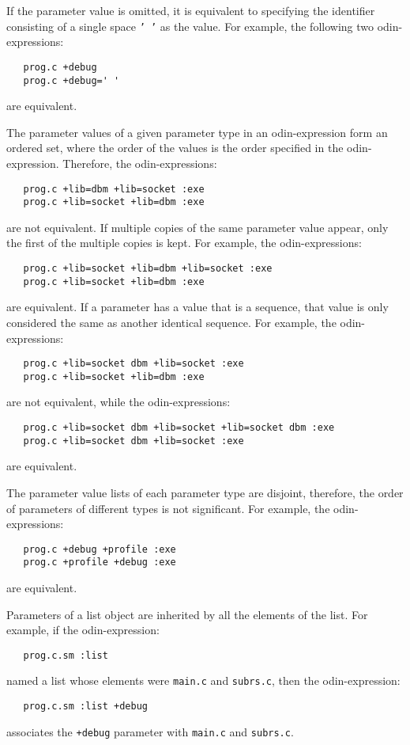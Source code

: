 \documentclass[hidelinks]{report}
\newcommand{\ex}{\tt}   %
\begin{document}
If the parameter value is omitted,
it is equivalent to specifying the identifier consisting of a single space
{\ex ' '} as the value.
For example, the following two odin-expressions:
\begin{verbatim}
   prog.c +debug
   prog.c +debug=' '
\end{verbatim}
are equivalent.

The parameter values of a given parameter type in an odin-expression
form an ordered set,
where the order of the values is the order specified in the odin-expression.
Therefore, the odin-expressions:
\begin{verbatim}
   prog.c +lib=dbm +lib=socket :exe
   prog.c +lib=socket +lib=dbm :exe
\end{verbatim}
are not equivalent.
If multiple copies of the same parameter value appear, only the first
of the multiple copies is kept.
For example, the odin-expressions:
\begin{verbatim}
   prog.c +lib=socket +lib=dbm +lib=socket :exe
   prog.c +lib=socket +lib=dbm :exe
\end{verbatim}
are equivalent.
If a parameter has a value that is a sequence,
that value is only considered the same as another identical sequence.
For example, the odin-expressions:
\begin{verbatim}
   prog.c +lib=socket dbm +lib=socket :exe
   prog.c +lib=socket +lib=dbm :exe
\end{verbatim}
are not equivalent, while the odin-expressions:
\begin{verbatim}
   prog.c +lib=socket dbm +lib=socket +lib=socket dbm :exe
   prog.c +lib=socket dbm +lib=socket :exe
\end{verbatim}
are equivalent.

The parameter value lists of each parameter type are disjoint,
therefore, the order of parameters of different types is not significant.
For example, the odin-expressions:
\begin{verbatim}
   prog.c +debug +profile :exe
   prog.c +profile +debug :exe
\end{verbatim}
are equivalent.

Parameters of a list object are inherited by all the elements of the list.
For example, if the odin-expression:
\begin{verbatim}
   prog.c.sm :list
\end{verbatim}
named a list whose elements were {\ex main.c} and {\ex subrs.c},
then the odin-expression:
\begin{verbatim}
   prog.c.sm :list +debug
\end{verbatim}
associates the {\ex +debug} parameter with {\ex main.c} and {\ex subrs.c}.
\end{document}
